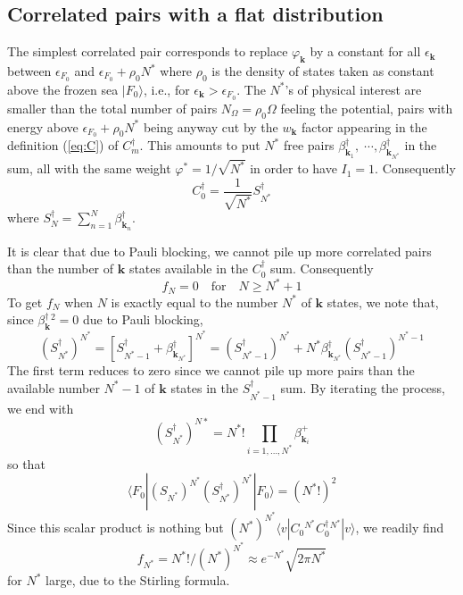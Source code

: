\documentclass[aps,prb,preprint,groupedaddress,amsmath]{revtex4-1}
\newcommand{\vk}{\ensuremath{\mathbf{k}}}
\newcommand{\dg}{\ensuremath{\dagger}}
\begin{document}
\subsection{Correlated pairs with a flat distribution}
The simplest correlated pair corresponds to replace $\varphi_\vk$ by a constant for all $\epsilon_\vk$ between $\epsilon_{F_0}$ and $\epsilon_{F_0}+\rho_0N^*$ where $\rho_0$ is the density of states taken as constant above the frozen sea $|F_0\rangle$, i.e., for $\epsilon_\vk>\epsilon_{F_0}$. The $N^*$'s of physical interest are smaller than the total number of pairs $N_\Omega=\rho_0\Omega$ feeling the potential,  pairs with energy above $\epsilon_{F_0}+\rho_0N^*$ being anyway cut by the $w_\vk$ factor appearing in the definition (\ref{eq:C}) of $C_m^\dg$.  This amounts to put $N^*$ free pairs $\beta_{\vk_1}^\dg,\;\cdots,\beta_{\vk_{N^*}}^\dg$ in the sum, all with the same weight $\varphi^*=1/\sqrt{N^*}$ in order to have $I_1=1$.  Consequently
\begin{equation}
C^\dg_0=\frac1{\sqrt{N^*}}S^\dg_{N^*}
\end{equation}
 where $S_N^\dg=\sum_{n=1}^N\beta^\dg_{\vk_n}$. 

It is clear that due to Pauli blocking, we cannot pile up more correlated pairs than the number of $\vk$ states available in the $C^\dg_0$ sum.  Consequently
\begin{equation}
f_N=0\quad \mbox{for}\quad N\geq{}N^*+1
\end{equation}
To get $f_N$ when $N$ is exactly equal to the number $N^*$ of $\vk$ states, we note that, since $\beta^\dg_\vk{}^2=0$ due to Pauli blocking,
\begin{equation}
(S_{N^*}^\dg)^{N^*}=[S^\dg_{N^*-1}+\beta^\dg_{\vk_{N^*}}]^{N^*}=(S_{N^*-1}^\dg)^{N^*}+N^*\beta^\dg_{\vk_{N^*}}(S_{N^*-1}^\dg)^{N^*-1}
\end{equation}
The first term reduces to zero since we cannot pile up more pairs than the available number $N^*-1$ of $\vk$ states in the $S^\dg_{N^*-1}$ sum. By iterating the process, we end with 
\begin{equation}
(S^\dg_{N^*})^{N*}=N^*!\prod_{i=1,\dots,N^*}\beta_{\vk_i}^+
\end{equation}
 so that 
\begin{equation}\label{eq:FnSn}
\langle{F_0}|(S_{N^*}^{})^{N^*}(S_{N^*}^\dg)^{N^*}|F_0\rangle=(N^*!)^2
\end{equation}
Since this scalar product is nothing but $(N^*)^{N^*}\langle{}v|C_0{}^{N^*}C_0^\dg{}^{N^*}|v\rangle$, we readily find \begin{equation}
f_{N^*}=N^*!/(N^*)^{N^*}\approx{}e^{-N^*}\sqrt{2\pi{N^*}}
\end{equation}
 for $N^*$ large, due to the Stirling formula. 
 
\end{document}
